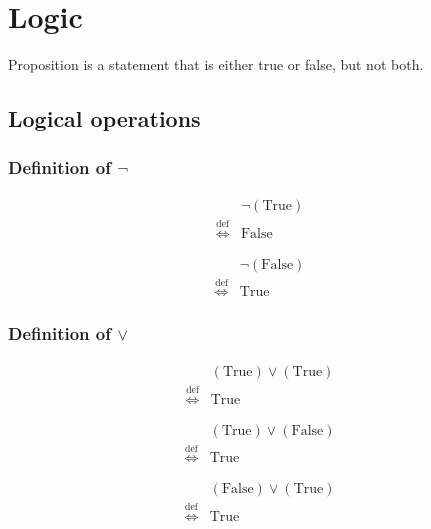 \chapter{Logic}
\begin{defn}
Proposition is a statement that is either true or false, but not both.
\end{defn}

\section{Logical operations}
\subsection{Definition of $\lnot$}
\begin{defn}
\label{Definition:lnot_True}
\begin{align*}
& \lnot (\text{True}) \\
\overset{\operatorname{def}}{\iff} & \text{False}
\end{align*}
\end{defn}

\begin{defn}
\label{Definition:lnot_False}
\begin{align*}
& \lnot (\text{False}) \\
\overset{\operatorname{def}}{\iff} & \text{True}
\end{align*}
\end{defn}

\subsection{Definition of $\lor$}
\begin{defn}
\label{Definition:lor_True_True}
\begin{align*}
& (\text{True}) \lor (\text{True}) \\
\overset{\operatorname{def}}{\iff} & \text{True}
\end{align*}
\end{defn}

\begin{defn}
\label{Definition:lor_True_False}
\begin{align*}
& (\text{True}) \lor (\text{False}) \\
\overset{\operatorname{def}}{\iff} & \text{True}
\end{align*}
\end{defn}

\begin{defn}
\label{Definition:lor_False_True}
\begin{align*}
& (\text{False}) \lor (\text{True}) \\
\overset{\operatorname{def}}{\iff} & \text{True}
\end{align*}
\end{defn}

